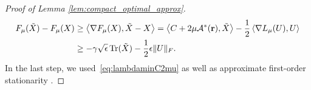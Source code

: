 \begin{proof}[Proof of Lemma \ref{lem:compact_optimal_approx}]
	\begin{align*}
		F_\mu(\tilde X) - F_\mu(X) & \geq \left\langle \nabla F_\mu(X), \tilde X - X \right\rangle  = \left\langle C+2\mu\mathcal{A}^*(\mathbf{r}), \tilde X \right\rangle - \frac{1}{2}\left\langle \nabla L_\mu(U), U \right\rangle \\
								   & \geq -\gamma \sqrt{\epsilon} \operatorname{Tr}(\tilde X) - \frac{1}{2}\epsilon \|U\|_F.
	\end{align*}
	In the last step, we used~\eqref{eq:lambdaminC2mu} as well as approximate first-order stationarity .
%	
\end{proof}



